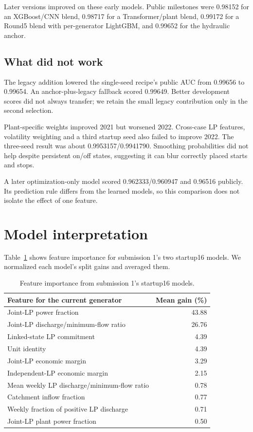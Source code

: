 \documentclass[a4paper,11pt]{article}
\begin{document}
Later versions improved on these early models. Public milestones were 0.98152 for an XGBoost/CNN blend, 0.98717 for a Transformer/plant blend, 0.99172 for a Round5 blend with per-generator LightGBM, and 0.99652 for the hydraulic anchor.

\subsection*{What did not work}
The legacy addition lowered the single-seed recipe's public AUC from 0.99656 to 0.99654. An anchor-plus-legacy fallback scored 0.99649. Better development scores did not always transfer; we retain the small legacy contribution only in the second selection.

Plant-specific weights improved 2021 but worsened 2022. Cross-case LP features, volatility weighting and a third startup seed also failed to improve 2022. The three-seed result was about 0.9953157/0.9941790. Smoothing probabilities did not help despite persistent on/off states, suggesting it can blur correctly placed starts and stops.

A later optimization-only model scored 0.962333/0.960947 and 0.96516 publicly. Its prediction rule differs from the learned models, so this comparison does not isolate the effect of one feature.

\section{Model interpretation}
Table~\ref{importance} shows feature importance for submission 1's two startup16 models. We normalized each model's split gains and averaged them.

\begin{table}[ht]
\centering\small
\begin{tabular}{lr}
\hline
Feature for the current generator & Mean gain (\%)\\\hline
Joint-LP power fraction & 43.88\\
Joint-LP discharge/minimum-flow ratio & 26.76\\
Linked-state LP commitment & 4.39\\
Unit identity & 4.39\\
Joint-LP economic margin & 3.29\\
Independent-LP economic margin & 2.15\\
Mean weekly LP discharge/minimum-flow ratio & 0.78\\
Catchment inflow fraction & 0.77\\
Weekly fraction of positive LP discharge & 0.71\\
Joint-LP plant power fraction & 0.50\\\hline
\end{tabular}
\caption{Feature importance from submission 1's startup16 models.}\label{importance}
\end{table}
\end{document}

